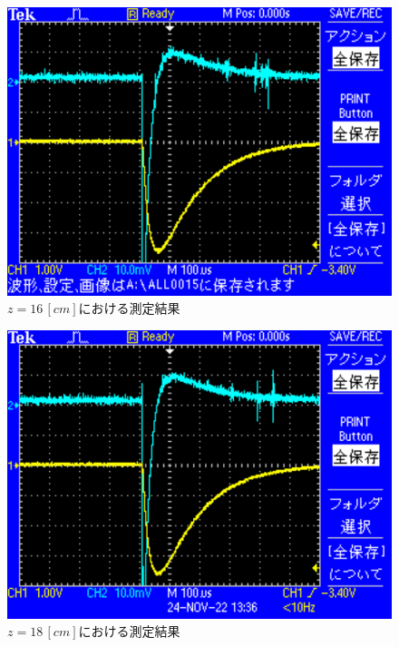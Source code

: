 \begin{figure}[H]
    \centering
    \includegraphics[scale=0.5]{images-9.pdf}
    \caption{$z=16\,[cm]$における測定結果}
\end{figure}

\begin{figure}[H]
    \centering
    \includegraphics[scale=0.5]{images-10.pdf}
    \caption{$z=18\,[cm]$における測定結果}
\end{figure}

